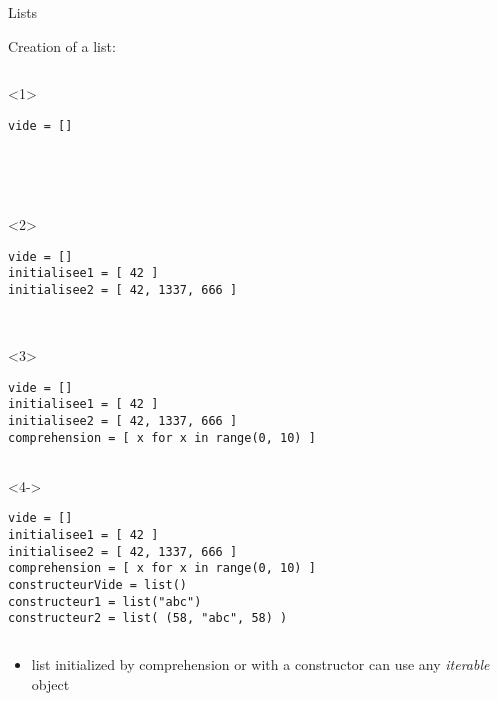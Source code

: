 \begin{frame}[fragile]{Lists}

  \begin{center}

  Creation of a list:

  \medskip

  \begin{columns}[onlytextwidth]
    \begin{column}{\textwidth}

      \begin{onlyenv}<1>
        \begin{lstlisting}[style=python,morekeywords={for, in, range, list}]
vide = []





 \end{lstlisting}
      \end{onlyenv}

      \begin{onlyenv}<2>
        \begin{lstlisting}[style=python,morekeywords={for, in, range, list}]
vide = []
initialisee1 = [ 42 ]
initialisee2 = [ 42, 1337, 666 ]



 \end{lstlisting}
      \end{onlyenv}

      \begin{onlyenv}<3>
        \begin{lstlisting}[style=python,morekeywords={for, in, range, list}]
vide = []
initialisee1 = [ 42 ]
initialisee2 = [ 42, 1337, 666 ]
comprehension = [ x for x in range(0, 10) ]


 \end{lstlisting}
      \end{onlyenv}

      \begin{onlyenv}<4->
        \begin{lstlisting}[style=python,morekeywords={for, in, range, list}]
vide = []
initialisee1 = [ 42 ]
initialisee2 = [ 42, 1337, 666 ]
comprehension = [ x for x in range(0, 10) ]
constructeurVide = list()
constructeur1 = list("abc")
constructeur2 = list( (58, "abc", 58) ) \end{lstlisting}
      \end{onlyenv}

    \end{column}
  \end{columns}

  \medskip

  \begin{itemize}
    \item<5-> list initialized by comprehension or with a constructor can use any \textit{iterable} object
  \end{itemize}

  \end{center}

\end{frame}


